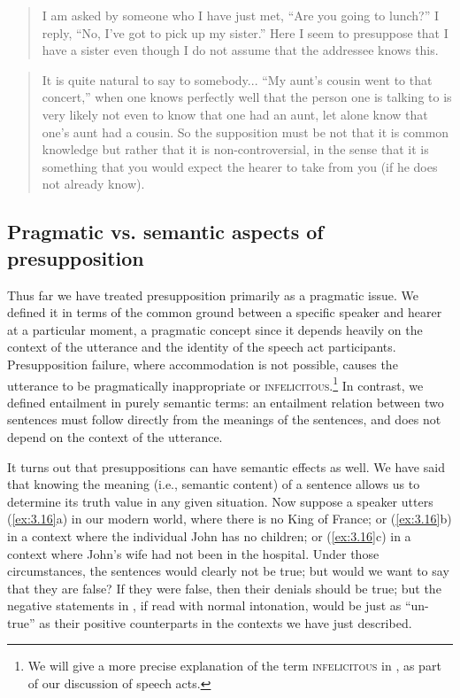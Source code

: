 \begin{quote}
I am asked by someone who I have just met, ``Are you going to lunch?'' I reply, ``No, I’ve got to pick up my sister.'' Here I seem to presuppose that I have a sister even though I do not assume that the addressee knows this. \citep[202]{Stalnaker1974} 
\end{quote}

\begin{quote}
It is quite natural to say to somebody... ``My aunt’s cousin went to that concert,'' when one knows perfectly well that the person one is talking to is very likely not even to know that one had an aunt, let alone know that one’s aunt had a cousin. So the supposition must be not that it is common knowledge but rather that it is non-controversial, in the sense that it is something that you would expect the hearer to take from you (if he does not already know). \citep[190]{Grice1981}
\end{quote}

\subsection{Pragmatic vs. semantic aspects of presupposition}\label{sec:3.4.3}

Thus far we have treated presupposition primarily as a pragmatic issue. We defined it in terms of the common ground between a specific speaker and hearer at a particular moment, a pragmatic concept since it depends heavily on the context of the utterance and the identity of the speech act participants. Presupposition failure, where accommodation is not possible, causes the utterance to be pragmatically inappropriate or \textsc{infelicitous}.\footnote{We will give a more precise explanation of the term \textsc{infelicitous} in , as part of our discussion of speech acts.} In contrast, we defined entailment in purely semantic terms: an entailment relation between two sentences must follow directly from the meanings of the sentences, and does not depend on the context of the utterance.



It turns out that presuppositions can have semantic effects as well. We have said that knowing the meaning (i.e., semantic content) of a sentence allows us to determine its truth value in any given situation. Now suppose a speaker utters (\ref{ex:3.16}a) in our modern world, where there is no King of France; or (\ref{ex:3.16}b) in a context where the individual John has no children; or (\ref{ex:3.16}c) in a context where John’s wife had not been in the hospital. Under those circumstances, the sentences would clearly not be true; but would we want to say that they are false? If they were false, then their denials should be true; but the negative statements in , if read with normal intonation, would be just as “un-true” as their positive counterparts in the contexts we have just described.


